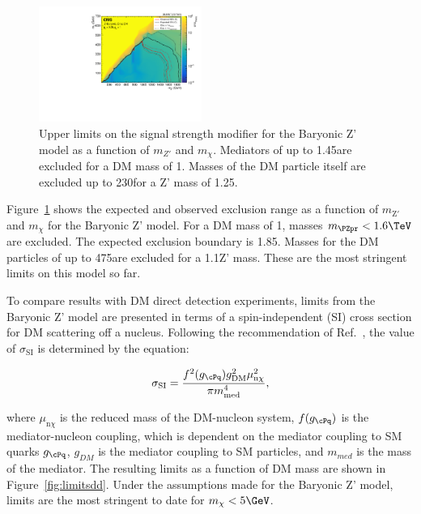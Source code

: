 \begin{figure}[htbp]
  \centering
  \includegraphics[width=0.475\textwidth]{figures/limits/limit2d_zpb_monohbb_.pdf}
  \caption{Upper limits on the signal strength modifier for the Baryonic Z' model  as a function of $m_{Z'}$ and $m_\chi$. Mediators of up to 1.45\TeV are excluded for a DM mass of 1\GeV. Masses of the DM particle itself are excluded up to 230\GeV for a Z' mass of 1.25\TeV.}
  \label{fig:limits}
\end{figure}




Figure~\ref{fig:limits} shows the expected and observed exclusion range as a function of $m_{\text{Z}'}$ and $m_{\chi}$ for the Baryonic Z' model. For a DM mass of 1\GeV, masses $\mzp<1.6\TeV$ are excluded. The expected exclusion boundary is 1.85\TeV. Masses for the DM particles of up to 475\GeV are excluded for a 1.1\TeV Z' mass. These are the most stringent limits on this model so far. %

To compare results with DM direct detection experiments, limits from the Baryonic Z' model are presented in terms of a spin-independent (SI) cross section \SigSI for DM scattering off a nucleus.
Following the recommendation of Ref.~\cite{presentDM}, the value of $\sigma_\text{SI}$ is determined by the equation:

\begin{equation}
\sigma_\text{SI} = \frac{f^2(g_{\cPq})g^2_{\mathrm{DM}}\mu^2_{\mathrm{n}\chi}}{\pi m^4_{\mathrm{med}}},
\end{equation}

where $\mu_{\mathrm{n}\chi}$ is the reduced mass of the DM-nucleon system, $f(g_{\cPq})$ is the mediator-nucleon coupling, which is dependent on the mediator coupling to SM quarks $g_{\cPq}$, $g_{DM}$ is the mediator coupling to SM particles, and $m_{med}$ is the mass of the mediator.
The resulting \SigSI limits as a function of DM mass are shown in Figure~\ref{fig:limitsdd}.
Under the assumptions made for the Baryonic Z' model, limits are the most stringent to date for $m_\chi < 5\GeV$.


